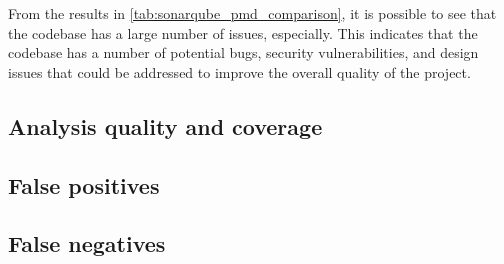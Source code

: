 From the results in \autoref{tab:sonarqube_pmd_comparison}, it is possible to see that the codebase has a large number of issues, especially. This indicates that the codebase has a number of potential bugs, security vulnerabilities, and design issues that could be addressed to improve the overall quality of the project.

\subsection{Analysis quality and coverage}

\subsection{False positives}

\subsection{False negatives}

